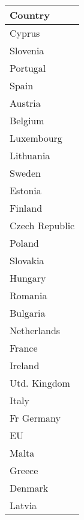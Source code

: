 \documentclass[12pt,a4paper,hidelinks]{article}            %
\begin{document}
\begin{table}\label{tab:declarants}
    \begin{tabular}{|l|}
    \hline
    \textbf{Country}\\
    \hline
    \hline
    Cyprus\\
    \hline
    Slovenia\\
    \hline
    Portugal\\
    \hline
    Spain\\
    \hline
    Austria\\
    \hline
    Belgium\\
    \hline
    Luxembourg\\
    \hline
    Lithuania\\
    \hline
    Sweden\\
    \hline
    Estonia\\
    \hline
    Finland\\
    \hline
    Czech Republic\\
    \hline
    Poland\\
    \hline
    Slovakia\\
    \hline
    Hungary\\
    \hline
    Romania\\
    \hline
    Bulgaria\\
    \hline
    Netherlands\\
    \hline
    France\\
    \hline
    Ireland\\
    \hline
    Utd. Kingdom\\
    \hline
    Italy\\
    \hline
    Fr Germany\\
    \hline
    EU\\
    \hline
    Malta\\
    \hline
    Greece\\
    \hline
    Denmark\\
    \hline
    Latvia\\
    \hline
    \end{tabular}
\end{table}
\end{document}
